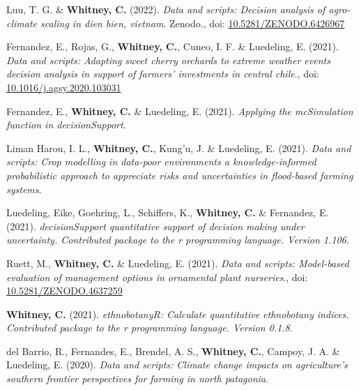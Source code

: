 \documentclass[11pt,a4paper,]{awesome-cv}
\newlength{\cslhangindent}
\newenvironment{CSLReferences}[2] %
 {\begin{list}{}{%
  \setlength{\itemindent}{0pt}
  \setlength{\leftmargin}{0pt}
  \setlength{\parsep}{0pt}
  \ifodd #1
   \setlength{\leftmargin}{\cslhangindent}
   \setlength{\itemindent}{-1\cslhangindent}
  \fi
  \setlength{\itemsep}{#2\baselineskip}}}
 {\end{list}}
\begin{document}
\label{refs-63c15d167cfd0d1b1facb05930bba091}
\begin{CSLReferences}{1}{0}
Luu, T. G. \& \textbf{Whitney, C.} (2022). \emph{Data and scripts:
Decision analysis of agro-climate scaling in dien bien, vietnam}.
Zenodo., doi:
\href{https://doi.org/10.5281/ZENODO.6426967}{10.5281/ZENODO.6426967}

Fernandez, E., Rojas, G., \textbf{Whitney, C.}, Cuneo, I. F. \&
Luedeling, E. (2021). \emph{Data and scripts: Adapting sweet cherry
orchards to extreme weather events decision analysis in support of
farmers' investments in central chile}., doi:
\href{https://doi.org/10.1016/j.agsy.2020.103031}{10.1016/j.agsy.2020.103031}

Fernandez, E., \textbf{Whitney, C.} \& Luedeling, E. (2021).
\emph{Applying the mcSimulation function in decisionSupport}.

Liman Harou, I. L., \textbf{Whitney, C.}, Kung'u, J. \& Luedeling, E.
(2021). \emph{Data and scripts: Crop modelling in data-poor environments
a knowledge-informed probabilistic approach to appreciate risks and
uncertainties in flood-based farming systems}.

Luedeling, Eike, Goehring, L., Schiffers, K., \textbf{Whitney, C.} \&
Fernandez, E. (2021). \emph{decisionSupport quantitative support of
decision making under uncertainty. Contributed package to the r
programming language. Version 1.106}.

Ruett, M., \textbf{Whitney, C.} \& Luedeling, E. (2021). \emph{Data and
scripts: Model-based evaluation of management options in ornamental
plant nurseries}., doi:
\href{https://doi.org/10.5281/ZENODO.4637259}{10.5281/ZENODO.4637259}

\textbf{Whitney, C.} (2021). \emph{ethnobotanyR: Calculate quantitative
ethnobotany indices. Contributed package to the r programming language.
Version 0.1.8}.

del Barrio, R., Fernandes, E., Brendel, A. S., \textbf{Whitney, C.},
Campoy, J. A. \& Luedeling, E. (2020). \emph{Data and scripts: Climate
change impacts on agriculture's southern frontier perspectives for
farming in north patagonia}.


\end{CSLReferences}
\end{document}
